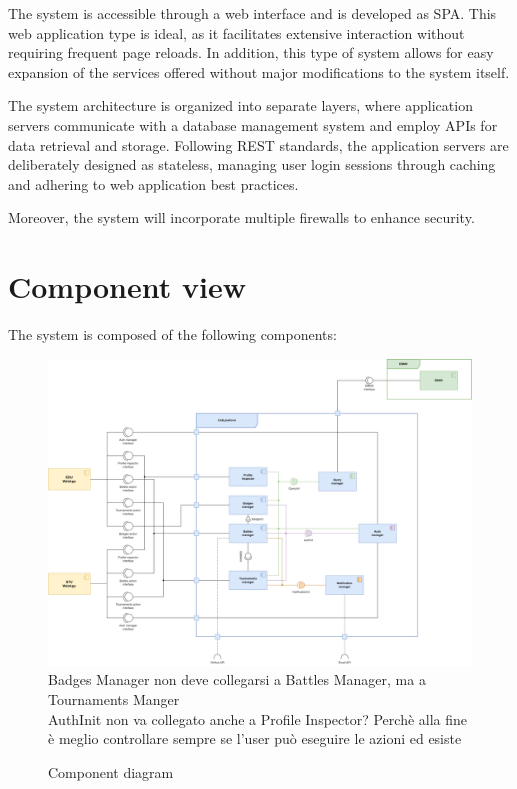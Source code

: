 The system is accessible through a web interface and is developed as SPA. 
This web application type is ideal, as it facilitates extensive interaction without requiring frequent page reloads. 
In addition, this type of system allows for easy expansion of the services offered without major modifications to the system itself. 

The system architecture is organized into separate layers, where application servers communicate with a database management system and employ APIs for data retrieval and storage. 
Following REST standards, the application servers are deliberately designed as stateless, managing user login sessions through caching and adhering to web application best practices. 

Moreover, the system will incorporate multiple firewalls to enhance security.

\section{Component view}

The system is composed of the following components:

\begin{figure}[H]
    \centering
    \includegraphics[width=\textwidth]{images/diagrams/component_diagram.png}
    {\color{red}
        Badges Manager non deve collegarsi a Battles Manager, ma a Tournaments Manger \\
        AuthInit non va collegato anche a Profile Inspector? Perchè alla fine è meglio controllare sempre se l'user può eseguire le azioni ed esiste \\
    }
    \caption{Component diagram}
\end{figure}

